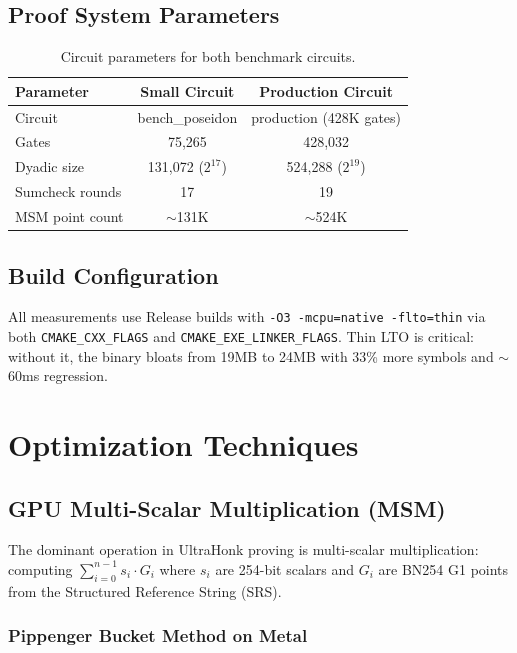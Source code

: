 \documentclass[11pt,a4paper]{article}
\begin{document}
\subsection{Proof System Parameters}

\begin{table}[H]
\centering
\begin{tabular}{lcc}
\toprule
\textbf{Parameter} & \textbf{Small Circuit} & \textbf{Production Circuit} \\
\midrule
Circuit & bench\_poseidon & production (428K gates) \\
Gates & 75,265 & 428,032 \\
Dyadic size & 131,072 ($2^{17}$) & 524,288 ($2^{19}$) \\
Sumcheck rounds & 17 & 19 \\
MSM point count & $\sim$131K & $\sim$524K \\
\bottomrule
\end{tabular}
\caption{Circuit parameters for both benchmark circuits.}
\end{table}

\subsection{Build Configuration}

All measurements use Release builds with \texttt{-O3 -mcpu=native -flto=thin} via both \texttt{CMAKE\_CXX\_FLAGS} and \texttt{CMAKE\_EXE\_LINKER\_FLAGS}. Thin LTO is critical: without it, the binary bloats from 19MB to 24MB with 33\% more symbols and $\sim$60ms regression.

\section{Optimization Techniques}

\subsection{GPU Multi-Scalar Multiplication (MSM)}

The dominant operation in UltraHonk proving is multi-scalar multiplication: computing $\sum_{i=0}^{n-1} s_i \cdot G_i$ where $s_i$ are 254-bit scalars and $G_i$ are BN254 G1 points from the Structured Reference String (SRS).

\subsubsection{Pippenger Bucket Method on Metal}
\end{document}
